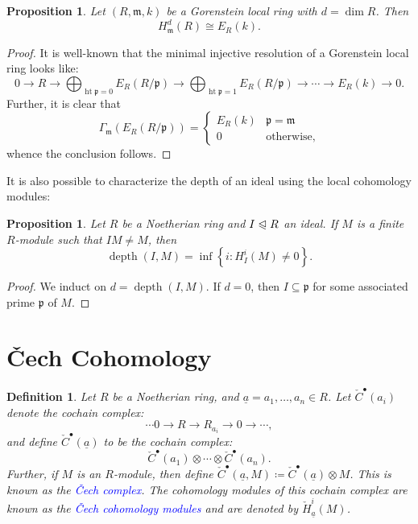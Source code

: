 \documentclass[10pt]{article}
\theoremstyle{thmstyle}
\newtheorem{proposition}[theorem]{Proposition}
\theoremstyle{defstyle}
\newtheorem{definition}[theorem]{Definition}
\newcommand{\frakm}{\mathfrak{m}} %
\newcommand{\frakp}{\mathfrak{p}} %
\newcommand{\define}[1]{\textcolor{blue}{\textit{#1}}}
\newcommand{\noreq}{\trianglelefteqslant}
\newcommand{\hght}{\operatorname{ht}}
\newcommand{\depth}{\operatorname{depth}}
\newcommand{\ul}[1]{\underline{#1}}
\newcommand{\cech}[1]{\mathbin{\check{#1}}}
\begin{document}
\begin{proposition}
	Let $(R,\frakm,k)$ be a Gorenstein local ring with $d = \dim R$. Then 
	\begin{equation*}
		H^d_{\frakm}(R)\cong E_R(k).
	\end{equation*}
\end{proposition}
\begin{proof}
	It is well-known that the minimal injective resolution of a Gorenstein local ring looks like:
	\begin{equation*}
		0\to R\to\bigoplus_{\hght\frakp = 0} E_R(R/\frakp)\to\bigoplus_{\hght\frakp = 1} E_R(R/\frakp)\to\cdots\to E_R(k)\to 0.
	\end{equation*}
	Further, it is clear that 
	\begin{equation*}
		\Gamma_{\frakm}\left(E_R(R/\frakp)\right) = 
		\begin{cases}
			E_R(k) & \frakp = \frakm\\
			0 & \text{otherwise},
		\end{cases}
	\end{equation*}
	whence the conclusion follows.
\end{proof}

It is also possible to characterize the depth of an ideal using the local cohomology modules: 
\begin{proposition}
	Let $R$ be a Noetherian ring and $I\noreq R$ an ideal. If $M$ is a finite $R$-module such that $IM\ne M$, then 
	\begin{equation*}
		\depth(I, M) = \inf\left\{i\colon H^i_I(M)\ne 0\right\}.
	\end{equation*}
\end{proposition}
\begin{proof}
	We induct on $d = \depth(I, M)$. If $d = 0$, then $I\subseteq\frakp$ for some associated prime $\frakp$ of $M$. %
\end{proof}

\section{\v Cech Cohomology}

\begin{definition}
	Let $R$ be a Noetherian ring, and $\ul a = a_1,\dots,a_n\in R$. Let $\cech{C}^\bullet(a_i)$ denote the cochain complex:
	\begin{equation*}
		\cdots 0\to R\to R_{a_i}\to 0\to\cdots,
	\end{equation*}
	and define $\cech{C}^\bullet(\ul a)$ to be the cochain complex:
	\begin{equation*}
		\cech{C}^\bullet(a_1)\otimes\cdots\otimes \cech{C}^\bullet(a_n).
	\end{equation*}
	Further, if $M$ is an $R$-module, then define $\cech{C}^\bullet(\ul a, M)\coloneq \cech{C}^\bullet(\ul a)\otimes M$. This is known as the \define{\v{C}ech complex}. The cohomology modules of this cochain complex are known as the \define{\v{C}ech cohomology modules} and are denoted by $\cech{H}^i_{\ul a}(M)$.
\end{definition}
\end{document}
